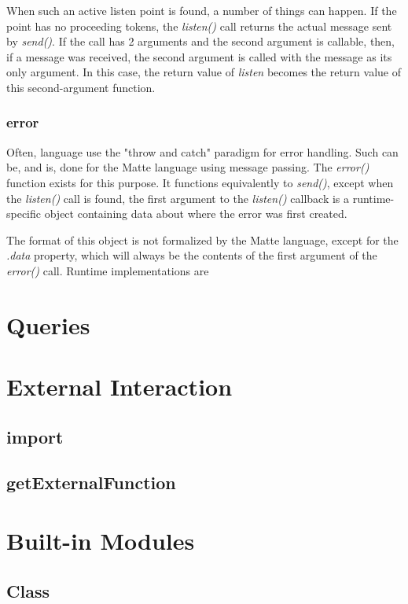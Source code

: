 \documentclass[12pt,letterpaper]{report}
\begin{document}
When such an active listen point is found, a number of things can happen.
If the point has no proceeding tokens, the \textit{listen()} call returns 
the actual message sent by \textit{send()}. If the call has 2 arguments and the second 
argument is callable, then, if a message was received, the second argument is called 
with the message as its only argument. In this case, the return value of \textit{listen} 
becomes the return value of this second-argument function.



\subsection{error}\label{error}

Often, language use the "throw and catch" paradigm for error handling. Such can be, and is, done 
for the Matte language using message passing. The \textit{error()} function exists for this purpose. It functions 
equivalently to \textit{send()}, except when the \textit{listen()} call is found, the first argument 
to the \textit{listen()} callback is a runtime-specific object containing data about where the error 
was first created. 

The format of this object is not formalized by the Matte language, except for the 
\textit{.data} property, which will always be the contents of the first argument 
of the \textit{error()} call. Runtime implementations are 

\chapter{Queries}\label{Queries}
\chapter{External Interaction}\label{External Interaction}
\section{import}\label{import}
\section{getExternalFunction}\label{getExternalFunction}
\chapter{Built-in Modules}\label{Built-in Modules}
\section{Class}\label{Class}
\end{document}
